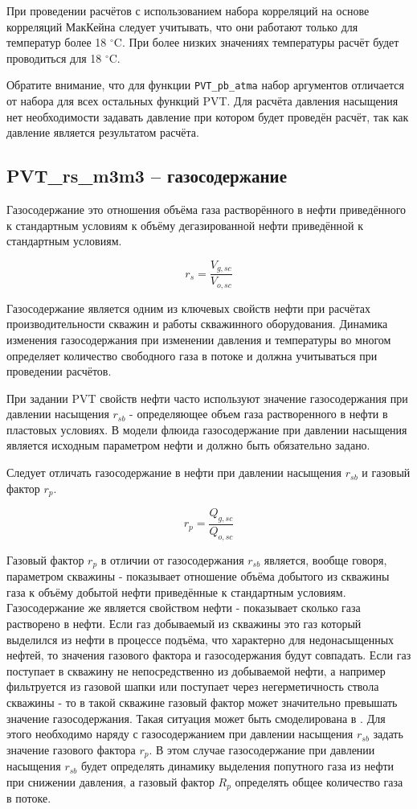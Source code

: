 При проведении расчётов с использованием набора корреляций на основе корреляций МакКейна следует учитывать, что они работают только для температур более 18 $^\circ$C. При более низких значениях температуры расчёт будет проводиться для 18 $^\circ$C.

Обратите внимание, что для функции \texttt{PVT_pb_atma} набор аргументов отличается от набора для всех остальных функций PVT. Для расчёта давления насыщения нет необходимости задавать давление при котором будет проведён расчёт, так как давление является результатом расчёта.

\subsection{PVT\_rs\_m3m3 – газосодержание}

Газосодержание это отношения объёма газа растворённого в нефти приведённого к стандартным условиям к объёму дегазированной нефти приведённой к стандартным условиям. 

$$r_s = \frac{V_{g,sc}}{V_{o,sc}}$$

Газосодержание является одним из ключевых свойств нефти при расчётах производительности скважин и работы скважинного оборудования. Динамика изменения газосодержания при изменении давления и температуры во многом определяет количество свободного газа в потоке и должна учитываться при проведении расчётов. 

При задании PVT свойств нефти часто используют значение газосодержания при давлении насыщения $r_{sb}$ - определяющее объем газа растворенного в нефти в пластовых условиях. В модели флюида \unf{} газосодержание при давлении насыщения является исходным параметром нефти и должно быть обязательно задано. 

Следует отличать газосодержание в нефти при давлении насыщения $r_{sb}$ и газовый фактор $r_p$.

$$r_p = \frac{Q_{g,sc}}{Q_{o,sc}}$$

Газовый фактор $r_{p}$  в отличии от газосодержания $r_{sb}$  является, вообще говоря, параметром скважины - показывает отношение объёма добытого из скважины газа  к объёму добытой нефти приведённые к стандартным условиям. Газосодержание же является свойством нефти - показывает сколько газа растворено в нефти. Если газ добываемый из скважины это газ который выделился из нефти в процессе подъёма, что характерно для недонасыщенных нефтей, то значения газового фактора и газосодержания будут совпадать. Если газ поступает в скважину не непосредственно из добываемой нефти, а например фильтруется из газовой шапки или поступает через негерметичность ствола скважины - то в такой скважине газовый фактор может значительно превышать значение газосодержания. Такая ситуация может быть смоделирована в \unf{}. Для этого необходимо наряду с газосодержанием при давлении насыщения $r_{sb}$ задать значение газового фактора $r_p$. В этом случае газосодержание при давлении насыщения $r_{sb}$  будет определять динамику выделения попутного газа из нефти при снижении давления, а газовый фактор $R_p$ определять общее количество газа в потоке. 

